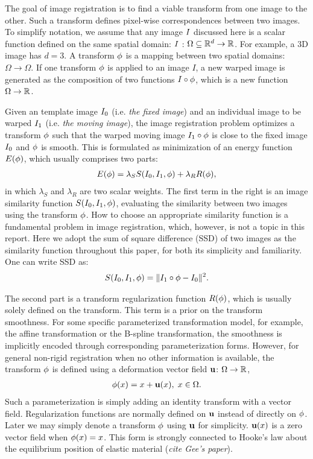 \documentclass[letterpaper,12pt]{article}
\begin{document}
The goal of image registration is to find a viable transform from one image to the other. Such a transform defines pixel-wise correspondences between two images. 
To simplify notation, we assume that any image $I$ discussed here is a scalar function defined on the same spatial domain: $I$ : $\Omega \subseteq \mathbb{R}^d \to \mathbb{R}$. 
For example, a 3D image has $d=3$. A transform $\phi$ is a mapping between two spatial domains: $\Omega \rightarrow \Omega$. 
If one transform $\phi$ is applied to an image $I$, a new warped
image is generated as the composition of two functions $I \circ
\phi$, which is a new function $\Omega \to \mathbb{R}$. 

Given an template image $I_0$ (i.e. \textit{the fixed image}) and an
individual image to be warped $I_1$ (i.e. \textit{the moving image}),
the image registration problem optimizes a transform $\phi$ such
that the warped moving image $I_1 \circ \phi$ is close to the fixed image $I_0$ and $\phi$ is smooth. 
This is formulated as minimization of an energy function
$E(\phi)$, which usually comprises two parts:
\begin{align}
\label{eq:energy}
E(\phi) = \lambda_S S(I_0,I_1,\phi) + \lambda_R R(\phi),
\end{align}
in which $\lambda_S$ and $\lambda_R$ are two scalar weights. The first term in the right is an image similarity function $S(I_0, I_1, \phi)$, evaluating the similarity between two images using the transform $\phi$. 
How to choose an appropriate similarity function is a fundamental problem in image registration, which, however, is not a topic in this report. 
Here we adopt the sum of square difference (SSD) of two images as the
similarity function throughout this paper, for both its simplicity and
familiarity. One can write SSD as:
\begin{align}
S(I_0, I_1, \phi) = \| I_1 \circ \phi - I_0 \|^2.
\label{eq:SSD}
\end{align}

The second part is a transform regularization function $R(\phi)$,
which is usually solely defined on the transform. This term is a prior
on the transform smoothness. For some specific parameterized transformation model, for example, the affine transformation or the B-spline transformation, the smoothness is implicitly encoded through corresponding parameterization forms. 
However, for general non-rigid registration when no other information is available, the transform $\phi$ is defined using a deformation vector field $\mathbf{u}$: $\Omega \to \mathbb{R}$,
\begin{align}
\phi(x) = x + \mathbf{u}(x), \; x \in \Omega.
\end{align}
Such a parameterization is simply adding an identity transform with a vector field. 
Regularization functions are normally defined on $\mathbf{u}$ instead of directly on $\phi$.
Later we may simply denote a transform $\phi$ using $\mathbf{u}$ for simplicity. 
$\mathbf{u}(x)$ is a zero vector field when $\phi(x)=x$. 
This form is strongly connected to Hooke's law about the equilibrium position of elastic material (\textit{cite Gee's paper}). 
\end{document}
